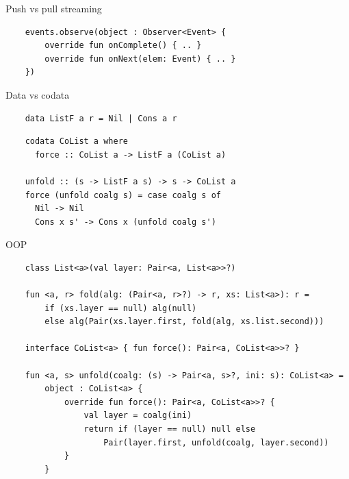     \begin{frame}[fragile]{Push vs pull streaming}
        \pause
        \begin{verbatim}
    events.observe(object : Observer<Event> {
        override fun onComplete() { .. }
        override fun onNext(elem: Event) { .. }
    })
        \end{verbatim}
    \end{frame}

    \begin{frame}[fragile]{Data vs codata}
        \pause
        \begin{verbatim}
    data ListF a r = Nil | Cons a r
        \end{verbatim}
        \pause\vspace{1em}
        \begin{verbatim}
    codata CoList a where
      force :: CoList a -> ListF a (CoList a)

    unfold :: (s -> ListF a s) -> s -> CoList a
    force (unfold coalg s) = case coalg s of
      Nil -> Nil
      Cons x s' -> Cons x (unfold coalg s')
        \end{verbatim}
    \end{frame}

    \begin{frame}[fragile]{OOP}
        \pause
        \begin{verbatim}
    class List<a>(val layer: Pair<a, List<a>>?)

    fun <a, r> fold(alg: (Pair<a, r>?) -> r, xs: List<a>): r =
        if (xs.layer == null) alg(null)
        else alg(Pair(xs.layer.first, fold(alg, xs.list.second)))

    interface CoList<a> { fun force(): Pair<a, CoList<a>>? }

    fun <a, s> unfold(coalg: (s) -> Pair<a, s>?, ini: s): CoList<a> =
        object : CoList<a> {
            override fun force(): Pair<a, CoList<a>>? {
                val layer = coalg(ini)
                return if (layer == null) null else
                    Pair(layer.first, unfold(coalg, layer.second))
            }
        }
        \end{verbatim}
    \end{frame}



